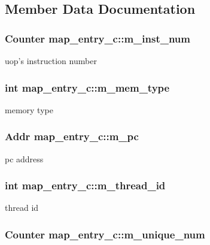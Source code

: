 \subsection{Member Data Documentation}
\hypertarget{classmap__entry__c_ad89c46be260e96eac067256a202c9b5e}{
\subsubsection[{m\_\-inst\_\-num}]{\setlength{\rightskip}{0pt plus 5cm}Counter {\bf map\_\-entry\_\-c::m\_\-inst\_\-num}}}
\label{classmap__entry__c_ad89c46be260e96eac067256a202c9b5e}
uop's instruction number \hypertarget{classmap__entry__c_ac290f8ec57135c8a9570f9963cb0256c}{
\subsubsection[{m\_\-mem\_\-type}]{\setlength{\rightskip}{0pt plus 5cm}int {\bf map\_\-entry\_\-c::m\_\-mem\_\-type}}}
\label{classmap__entry__c_ac290f8ec57135c8a9570f9963cb0256c}
memory type \hypertarget{classmap__entry__c_a9950a129015b7524a2623549f58aefcc}{
\subsubsection[{m\_\-pc}]{\setlength{\rightskip}{0pt plus 5cm}Addr {\bf map\_\-entry\_\-c::m\_\-pc}}}
\label{classmap__entry__c_a9950a129015b7524a2623549f58aefcc}
pc address \hypertarget{classmap__entry__c_a3d60eba98c1ca2e9e41dc99ab84ae686}{
\subsubsection[{m\_\-thread\_\-id}]{\setlength{\rightskip}{0pt plus 5cm}int {\bf map\_\-entry\_\-c::m\_\-thread\_\-id}}}
\label{classmap__entry__c_a3d60eba98c1ca2e9e41dc99ab84ae686}
thread id \hypertarget{classmap__entry__c_a0a8a7d10cd323dd0df59c45f4af1e464}{
\subsubsection[{m\_\-unique\_\-num}]{\setlength{\rightskip}{0pt plus 5cm}Counter {\bf map\_\-entry\_\-c::m\_\-unique\_\-num}}}
